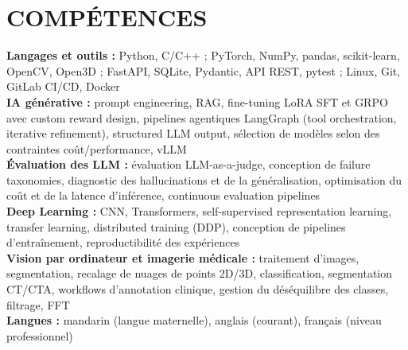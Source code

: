 \documentclass[a4paper,12pt]{article}
\let\oldsection\section
\renewcommand{\section}[1]{\needspace{5\baselineskip}\oldsection{#1}}
\begin{document}
\section{COMPÉTENCES}
 \begin{itemize}[leftmargin=0.2in, label={}]
    \small{\item{
    \textbf{Langages et outils :} Python, C/C++ ; PyTorch, NumPy, pandas, scikit-learn, OpenCV, Open3D ; FastAPI, SQLite, Pydantic, API REST, pytest ; Linux, Git, GitLab CI/CD, Docker\\
    \textbf{IA générative :} prompt engineering, RAG, fine-tuning LoRA SFT et GRPO avec custom reward design, pipelines agentiques LangGraph (tool orchestration, iterative refinement), structured LLM output, sélection de modèles selon des contraintes coût/performance, vLLM\\
    \textbf{Évaluation des LLM :} évaluation LLM-as-a-judge, conception de failure taxonomies, diagnostic des hallucinations et de la généralisation, optimisation du coût et de la latence d'inférence, continuous evaluation pipelines\\
    \textbf{Deep Learning :} CNN, Transformers, self-supervised representation learning, transfer learning, distributed training (DDP), conception de pipelines d'entraînement, reproductibilité des expériences\\
    \textbf{Vision par ordinateur et imagerie médicale :} traitement d'images, segmentation, recalage de nuages de points 2D/3D, classification, segmentation CT/CTA, workflows d'annotation clinique, gestion du déséquilibre des classes, filtrage, FFT\\
    \textbf{Langues :} mandarin (langue maternelle), anglais (courant), français (niveau professionnel)
    }}
 \end{itemize}
\end{document}
